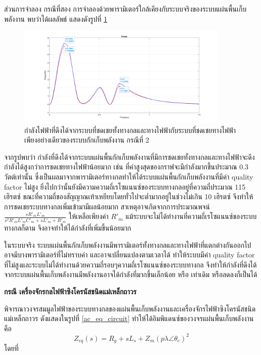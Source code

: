 \documentclass[11pt,a4paper]{article}
\begin{document}
ส่วนการจำลอง กรณีที่สอง การจำลองด้วยพารามิเตอร์ใกล้เคียงกับระบบจริงของระบบแผ่นพื้นเก็บพลังงาน พบว่าได้ผลลัพธ์ แสดงดังรูปที่ \ref{power_dc_case2}
\begin{figure}[H]
    \begin{center}
        \includegraphics[width=0.9\textwidth]{power_dc_case2.jpg}
    \end{center}
    \caption{กำลังไฟฟ้าที่ดึงได้จากระบบที่ชดเชยทั้งทางกลและทางไฟฟ้ากับระบบที่ชดเชยทางไฟฟ้าเพียงอย่างเดียวของระบบกักเก็บพลังงาน กรณีที่ 2}
    \label{power_dc_case2}
\end{figure}
จากรูปพบว่า กำลังที่ดึงได้จากระบบแผ่นพื้นกักเก็บพลังงานที่มีการชดเชยทั้งทางกลและทางไฟฟ้าจะดึงกำลังได้สูงกว่าการชดเชยทางไฟฟ้าน้อยมาก เช่น ที่ค่าสูงสุดของกราฟจะมีกำลังมากขึ้นประมาณ 0.3 วัตต์เท่านั้น
ซึ่งเป็นผลมาจากพารามิเตอร์ทางกลทำให้ได้ระบบแผ่นพื้นกักเก็บพลังงานที่มีค่า quality factor ไม่สูง ยิ่งไปกว่านั้นยังมีความความถี่เรโซแนนซ์ของระบบทางกลอยู่ที่ความถี่ประมาณ 115 เฮิรตซ์ ขณะที่ความถี่ของสัญญาณเท้าเหยียบโดยทั่วไปจะต่ำมากอยู่ในช่วงไม่เกิน 10 เฮิรตซ์
จึงทำให้การชดเชยระบบทางกลเพิ่มเข้ามามีผลน้อยมาก สาเหตุอาจเกิดจากการประมาณพจน์ $\frac{ sR'_{m}L'_{m} }{ s^2R'_{m}L'_{m}C'_{m} + sL'_{m} + R'_{m} }$ ให้เหลือเพียงค่า $R'_{m}$ แม้ระบบจะไม่ได้ทำงานที่ความถี่เรโซแนนซ์ของระบบทางกลก็ตาม จึงอาจทำให้ได้กำลังที่เพิ่มขึ้นน้อยมาก

ในระบบจริง ระบบแผ่นพื้นกักเก็บพลังงานมีพารามิเตอร์ทั้งทางกลและทางไฟฟ้าที่แตกต่างกันออกไป อาจมีบางพารามิเตอร์ที่ไม่ทราบค่า และอาจเปลี่ยนแปลงตามเวลาได้ ทำให้ระบบมีค่า quality factor ที่ไม่สูงและระบบไม่ได้ทำงานด้วยความถี่รอบๆความถี่เรโซแนนซ์ของระบบทางกล จึงทำให้กำลังที่ดึงได้จากระบบแผ่นพื้นเก็บพลังงานมีพลังงานอาจได้กำลังที่มากขึ้นเล็กน้อย หรือ เท่าเดิม หรือลดลงก็เป็นได้

\textbf{กรณี เครื่องจักรกลไฟฟ้าซิงโครนัสชนิดแม่เหล็กถาวร}

พิจารณาวงจรสมมูลไฟฟ้าของระบบทางกลของแผ่นพื้นเก็บพลังงานและเครื่องจักรไฟฟ้าซิงโครนัสชนิดแม่เหล็กถาวร ดังแสดงในรูปที่ \ref{ac_eq_circuit} ทำให้ได้อิมพิแดนซ์ของวงจรแผ่นพื้นเก็บพลังงาน คือ
\begin{equation} \label{}
    Z_{eq}(s)=  R_{g} + sL_{s} + Z_{m}(p\lambda \angle \theta_{e})^2
\end{equation}
โดยที่
\end{document}
